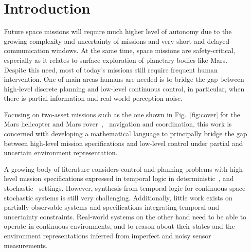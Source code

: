 \documentclass[letterpaper]{article} %
\begin{document}

	
	\section{Introduction} \label{subsec:intro}
	Future space missions will require much higher level of autonomy due to the growing complexity and uncertainty of missions and very short and delayed communication windows. At the same time, space missions are safety-critical, especially as it relates to surface exploration of planetary bodies like Mars. Despite this need, most of today's missions still require frequent human intervention. One of main areas humans are needed is to bridge the gap between high-level discrete planning and low-level continuous control, in particular, when there is partial information and real-world perception noise.

    Focusing on two-asset missions such as the one shown in Fig.~\ref{fig:cover} for the Mars helicopter and Mars rover~\cite{traverse2020},~\cite{mars2012} navigation and coordination, this work is concerned with developing a mathematical language to principally bridge the gap between high-level mission specifications and low-level control under partial and uncertain environment representation.
    
    A growing body of literature considers control and planning problems with high-level mission specifications
    expressed in temporal logic in
    deterministic~\cite{KB-TAC08-LTLCon,kress-gazit:whereswaldo?,Murray2009,VaBe-IROS-2013}, and
    stochastic~\cite{Lahijanian2012,svorenova2013,Ayala2014,Cristi-CDC-2016,Kaelbling98} settings.
    However, synthesis from temporal logic for continuous space stochastic systems is still very challenging.
    Additionally, little work exists on partially observable systems and specifications integrating
    temporal and uncertainty constraints.
    Real-world systems on the other hand need to be able to operate in continuous environments, and to reason about their states and the environment representations inferred from imperfect and noisy sensor measurements.
    
\end{document}
